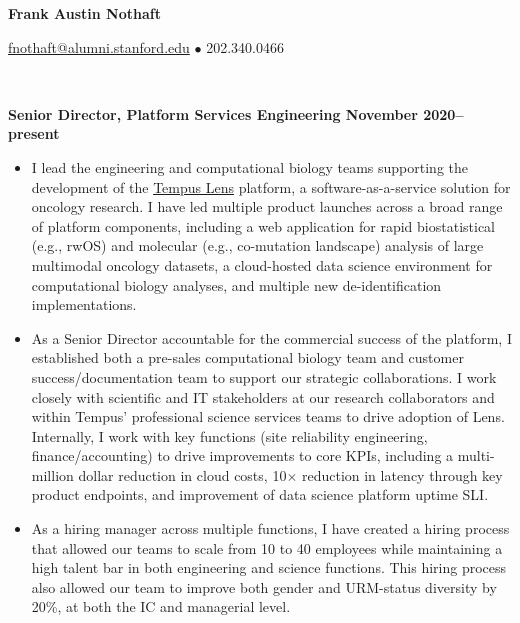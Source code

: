 \documentclass[10pt]{article} %
\begin{document}
\centerline {\large\bf Frank Austin Nothaft} 
\centerline {\href{mailto:fnothaft@alumni.stanford.edu}{fnothaft@alumni.stanford.edu} $\bullet$ 202.340.0466}
\noindent {}

\begin {minipage}[t]{0.2\linewidth}
\vspace{0pt}
\end {minipage}
\begin {minipage}[t]{0.8\linewidth}
\vspace{0pt}
 \\
\centerline {{\bf Senior Director, Platform Services Engineering \hfill November 2020--present}}
\begin{itemize}
\item {I lead the engineering and computational biology teams supporting the development of the \href{https://www.tempus.com/life-sciences/lens/}{Tempus Lens} platform, a software-as-a-service solution for oncology research. I have led multiple product launches across a broad range of platform components, including a web application for rapid biostatistical (e.g., rwOS) and molecular (e.g., co-mutation landscape) analysis of large multimodal oncology datasets, a cloud-hosted data science environment for computational biology analyses, and multiple new de-identification implementations.}
\item {As a Senior Director accountable for the commercial success of the platform, I established both a pre-sales computational biology team and customer success/documentation team to support our strategic collaborations. I work closely with scientific and IT stakeholders at our research collaborators and within Tempus' professional science services teams to drive adoption of Lens. Internally, I work with key functions (site reliability engineering, finance/accounting) to drive improvements to core KPIs, including a multi-million dollar reduction in cloud costs, 10$\times$ reduction in  latency through key product endpoints, and improvement of data science platform uptime SLI.}
\item {As a hiring manager across multiple functions, I have created a hiring process that allowed our teams to scale from 10 to 40 employees while maintaining a high talent bar in both engineering and science functions. This hiring process also allowed our team to improve both gender and URM-status diversity by 20\%, at both the IC and managerial level.}
\end{itemize}


\end{minipage}
\end{document}
